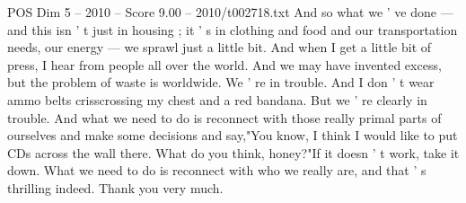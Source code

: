 \begin{textsample}{POS Dim 5 – 2010 – Score 9.00 – 2010/t002718.txt}
And so what we ' ve done — and this isn ' t just in housing ; it ' s in clothing and food and our transportation needs, our energy — we sprawl just a little bit.
And when I get a little bit of press, I hear from people all over the world.
And we may have invented excess, but the problem of waste is worldwide.
We ' re in trouble.
And I don ' t wear ammo belts crisscrossing my chest and a red bandana.
But we ' re clearly in trouble.
And what we need to do is reconnect with those really primal parts of ourselves and make some decisions and say,"You know, I think I would like to put CDs across the wall there.
What do you think, honey?"If it doesn ' t work, take it down.
What we need to do is reconnect with who we really are, and that ' s thrilling indeed.
Thank you very much.

\end{textsample}
